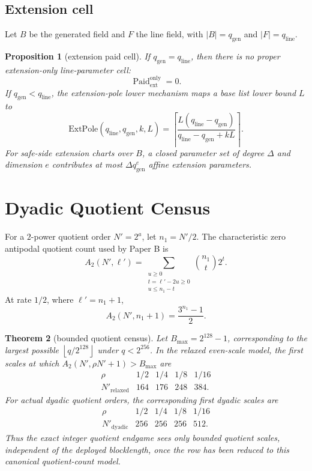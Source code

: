 \documentclass[11pt]{article}
\newtheorem{theorem}{Theorem}[section]
\newtheorem{proposition}[theorem]{Proposition}
\theoremstyle{definition}
\theoremstyle{remark}
\newcommand{\Paid}{\operatorname{Paid}}
\newcommand{\floor}[1]{\left\lfloor #1\right\rfloor}
\begin{document}
\subsection{Extension cell}

Let $B$ be the generated field and $F$ the line field, with
$|B|=q_{\mathrm{gen}}$ and $|F|=q_{\mathrm{line}}$.

\begin{proposition}[extension paid cell]\label{prop:extension}
If $q_{\mathrm{gen}}=q_{\mathrm{line}}$, then there is no proper extension-only
line-parameter cell:
\[
        \Paid_{\mathrm{ext}}^{\mathrm{only}}=0.
\]
If $q_{\mathrm{gen}}<q_{\mathrm{line}}$, the extension-pole lower mechanism
maps a base list lower bound $L$ to
\[
        \mathrm{ExtPole}(q_{\mathrm{line}},q_{\mathrm{gen}},k,L)
        =
        \left\lceil
        \frac{L(q_{\mathrm{line}}-q_{\mathrm{gen}})}
        {q_{\mathrm{line}}-q_{\mathrm{gen}}+kL}
        \right\rceil .
\]
For safe-side extension charts over $B$, a closed parameter set of degree
$\Delta$ and dimension $e$ contributes at most $\Delta q_{\mathrm{gen}}^e$
affine extension parameters.
\end{proposition}

\section{Dyadic Quotient Census}

For a $2$-power quotient order $N'=2^a$, let $n_1=N'/2$.  The characteristic
zero antipodal quotient count used by Paper B is
\[
        A_2(N',\ell')=
        \sum_{\substack{u\ge0\\ t=\ell'-2u\ge0\\u\le n_1-t}}
        \binom{n_1}{t}2^t.
\]
At rate $1/2$, where $\ell'=n_1+1$,
\[
        A_2(N',n_1+1)=\frac{3^{n_1}-1}{2}.
\]

\begin{theorem}[bounded quotient census]\label{thm:census}
Let $B_{\max}=2^{128}-1$, corresponding to the largest possible
$\floor{q/2^{128}}$ under $q<2^{256}$.  In the relaxed even-scale model, the
first scales at which $A_2(N',\rho N'+1)>B_{\max}$ are
\[
\begin{array}{c|cccc}
\rho & 1/2 & 1/4 & 1/8 & 1/16\\ \hline
N'_{\mathrm{relaxed}} & 164 & 176 & 248 & 384 .
\end{array}
\]
For actual dyadic quotient orders, the corresponding first dyadic scales are
\[
\begin{array}{c|cccc}
\rho & 1/2 & 1/4 & 1/8 & 1/16\\ \hline
N'_{\mathrm{dyadic}} & 256 & 256 & 256 & 512 .
\end{array}
\]
Thus the exact integer quotient endgame sees only bounded quotient scales,
independent of the deployed blocklength, once the row has been reduced to this
canonical quotient-count model.
\end{theorem}
\end{document}
